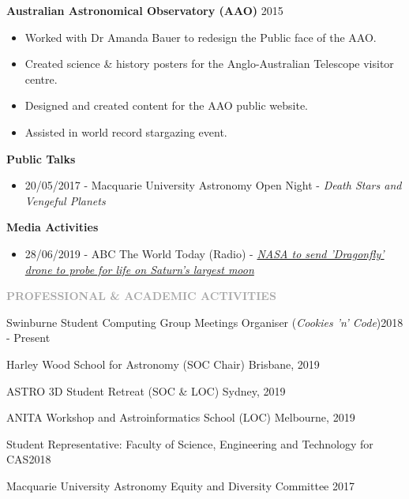 \documentclass[11pt]{extarticle}
\def\Vhrulefill{{\color{BurntOrange}{\leavevmode\leaders\hrule height 1.2ex depth \dimexpr0.5pt-0.9ex\hfill\kern5pt}}}
\begin{document}
\noindent
\textbf{Australian Astronomical Observatory (AAO)} \hfill 2015 \par
{}
\begin{itemize}[noitemsep]
\item Worked with Dr Amanda Bauer to redesign the Public face of the AAO.
\item Created science \& history posters for the Anglo-Australian Telescope visitor centre.
\item Designed and created content for the AAO public website.
\item Assisted in world record stargazing event.
\end{itemize}

\noindent
\textbf{Public Talks} \par
\begin{itemize}[noitemsep]
\item 20/05/2017 - Macquarie University Astronomy Open Night - \emph{Death Stars and Vengeful Planets}
\end{itemize}

\noindent
\textbf{Media Activities} \par
\begin{itemize}[noitemsep]
\item 28/06/2019 - ABC The World Today (Radio) - \href{https://www.abc.net.au/radio/programs/worldtoday/nasa-dragonfly-drone-to-land-on-saturns-moon-titan-in-2034/11260122}{\emph{NASA to send 'Dragonfly' drone to probe for life on Saturn's largest moon}}
\end{itemize}

\vspace{3ex}
\noindent
\textcolor{darkgray}{\Large\normalfont\bfseries\MakeUppercase{Professional \& Academic Activities}} \Vhrulefill
\vspace{2ex}

\noindent
Swinburne Student Computing Group Meetings Organiser (\emph{Cookies 'n' Code})\hfill 2018 - Present\par
\noindent
Harley Wood School for Astronomy (SOC Chair) \hfill Brisbane, 2019 \par
\noindent
ASTRO 3D Student Retreat (SOC \& LOC) \hfill Sydney, 2019 \par
\noindent
ANITA Workshop and Astroinformatics School (LOC) \hfill Melbourne, 2019 \par
\noindent
Student Representative: Faculty of Science, Engineering and Technology for CAS\hfill 2018\par
\noindent
Macquarie University Astronomy Equity and Diversity Committee \hfill 2017
\end{document}
